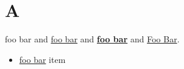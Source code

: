 \documentclass[11pt]{article}
\author{root}
\date{\today}
\title{}
\begin{document}
\tableofcontents

\section{A}
\label{sec:orgc3b30fa}
\label{org9b0d6a4}foo bar and \hyperref[org9b0d6a4]{foo
bar} and \textbf{\hyperref[org9b0d6a4]{foo bar}} and \hyperref[org9b0d6a4]{Foo Bar}.
\begin{itemize}
\item \hyperref[org9b0d6a4]{foo bar} item
\end{itemize}
\end{document}
